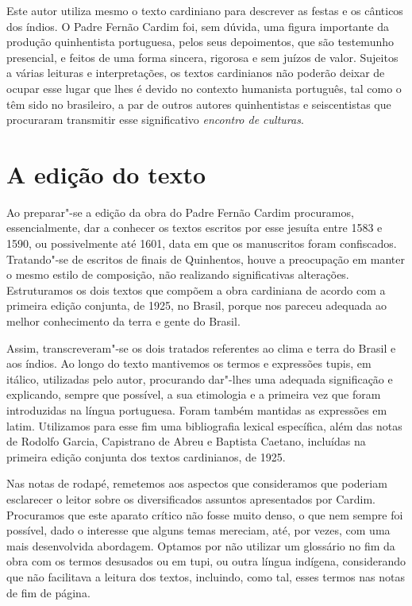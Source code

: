Este autor utiliza mesmo o texto cardiniano para descrever as festas e os cânticos dos índios. 
O Padre Fernão Cardim foi, sem dúvida, uma figura importante da
produção quinhentista portuguesa, pelos seus depoimentos, que são
testemunho presencial, e feitos de uma forma sincera, rigorosa e sem
juízos de valor. Sujeitos a várias leituras e interpretações, os textos
cardinianos não poderão deixar de ocupar esse lugar que lhes é devido
no contexto humanista português, tal como o têm sido no brasileiro, a
par de outros autores quinhentistas e seiscentistas que procuraram
transmitir esse significativo \textit{encontro de culturas}. 

\section{A edição do texto}

 Ao preparar"-se a edição da obra do Padre Fernão Cardim
procuramos, essencialmente, dar a conhecer os textos escritos por esse
jesuíta entre 1583 e 1590, ou possivelmente até 1601, data em que os
manuscritos foram confiscados. Tratando"-se de escritos de finais de
Quinhentos, houve a preocupação em manter o mesmo estilo de composição,
não realizando significativas alterações. Estruturamos os dois textos
que compõem a obra cardiniana de acordo com a primeira edição conjunta,
de 1925, no Brasil, porque nos pareceu adequada ao melhor conhecimento
da terra e gente do Brasil.

Assim, transcreveram"-se os dois tratados 
referentes ao clima e terra do Brasil e aos índios.
Ao longo do texto mantivemos os termos e expressões tupis, em
itálico, utilizadas pelo autor, procurando dar"-lhes uma adequada
significação e explicando, sempre que possível, a sua etimologia e a
primeira vez que foram introduzidas na língua portuguesa. Foram também
mantidas as expressões em latim. Utilizamos para esse fim uma
bibliografia lexical específica, além das notas de Rodolfo Garcia,
Capistrano de Abreu e Baptista Caetano, incluídas na primeira edição
conjunta dos textos cardinianos, de 1925.

Nas notas de rodapé, remetemos aos aspectos que consideramos que
poderiam esclarecer o leitor sobre os diversificados assuntos
apresentados por Cardim. Procuramos que este aparato crítico não fosse
muito denso, o que nem sempre foi possível, dado o interesse que alguns
temas mereciam, até, por vezes, com uma mais desenvolvida abordagem.
Optamos por não utilizar um glossário no fim da obra com os termos
desusados ou em tupi, ou outra língua indígena, considerando que não
facilitava a leitura dos textos, incluindo, como tal, esses termos nas
notas de fim de página. 

